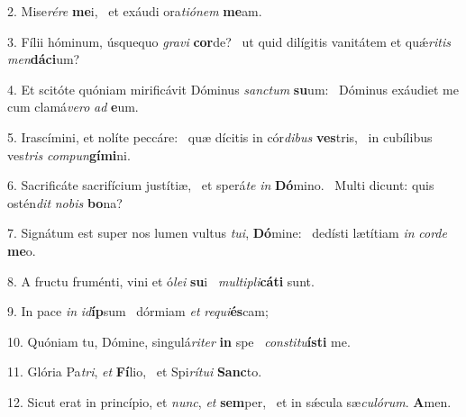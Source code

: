 2. Mise\textit{ré}\textit{re} \textbf{me}i, \ast\  et exáudi ora\textit{ti}\textit{ó}\textit{nem} \textbf{me}am.\

3. Fílii hóminum, úsquequo \textit{gra}\textit{vi} \textbf{cor}de? \ast\  ut quid dilígitis vanitátem et quǽ\textit{ri}\textit{tis} \textit{men}\textbf{dá}\textbf{ci}um?\

4. Et scitóte quóniam mirificávit Dóminus \textit{sanc}\textit{tum} \textbf{su}um: \ast\  Dóminus exáudiet me cum clamá\textit{ve}\textit{ro} \textit{ad} \textbf{e}um.\

5. Irascímini, et nolíte peccáre: \dag\  quæ dícitis in cór\textit{di}\textit{bus} \textbf{ves}tris, \ast\  in cubílibus ves\textit{tris} \textit{com}\textit{pun}\textbf{gí}\textbf{mi}ni.\

6. Sacrificáte sacrifícium justítiæ, \dag\  et sperá\textit{te} \textit{in} \textbf{Dó}mino. \ast\  Multi dicunt: quis ostén\textit{dit} \textit{no}\textit{bis} \textbf{bo}na?\

7. Signátum est super nos lumen vultus \textit{tu}\textit{i}, \textbf{Dó}mine: \ast\  dedísti lætítiam \textit{in} \textit{cor}\textit{de} \textbf{me}o.\

8. A fructu fruménti, vini et ó\textit{le}\textit{i} \textbf{su}i \ast\  \textit{mul}\textit{ti}\textit{pli}\textbf{cá}\textbf{ti} sunt.\

9. In pace \textit{in} \textit{id}\textbf{íp}sum \ast\  dórmiam \textit{et} \textit{re}\textit{qui}\textbf{és}cam;\

10. Quóniam tu, Dómine, singulá\textit{ri}\textit{ter} \textbf{in} spe \ast\  \textit{con}\textit{sti}\textit{tu}\textbf{ís}\textbf{ti} me.\

11. Glória Pa\textit{tri}, \textit{et} \textbf{Fí}lio, \ast\  et Spi\textit{rí}\textit{tu}\textit{i} \textbf{Sanc}to.\

12. Sicut erat in princípio, et \textit{nunc}, \textit{et} \textbf{sem}per, \ast\  et in sǽcula sæ\textit{cu}\textit{ló}\textit{rum}. \textbf{A}men.\

